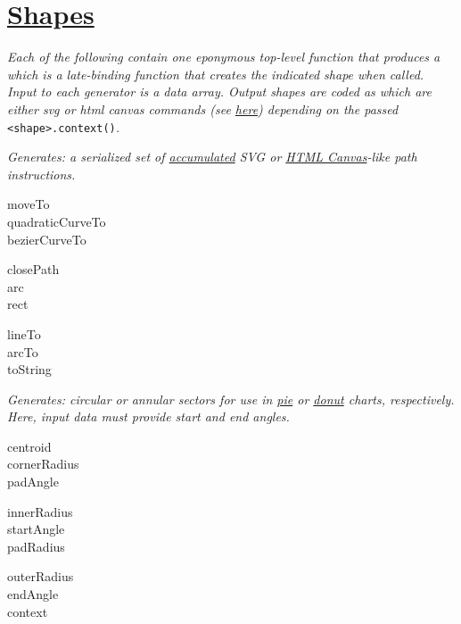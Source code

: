 \section{\href{https://github.com/d3/d3-shape}{Shapes}}

\textit{Each of the following contain one eponymous top-level function that produces a  which is a late-binding function that creates the indicated shape when called. Input to each generator is a data array. Output shapes are coded as  which are either svg or html canvas commands (see \href{https://observablehq.com/@d3/d3-line}{here}) depending on the passed }\texttt{<shape>.context()}\textit{.}



\textit{Generates: a serialized set of \href{https://observablehq.com/@d3/d3-path}{accumulated} SVG or \href{https://developer.mozilla.org/en/docs/Web/API/CanvasRenderingContext2D}{HTML Canvas}-like path instructions.}\\

{\footnotesize
\begin{minipage}[t]{2.6cm}
    moveTo\\
    quadraticCurveTo\\
    bezierCurveTo
\end{minipage}
\begin{minipage}[t]{1.8cm}
    closePath\\
    arc\\
    rect
\end{minipage}
\begin{minipage}[t]{1.6cm}
    lineTo\\
    arcTo\\
    toString
\end{minipage}
}


\textit{Generates: circular or annular sectors for use in \href{https://observablehq.com/@d3/pie-chart}{pie} or \href{https://observablehq.com/@d3/donut-chart}{donut} charts, respectively. Here, input data must provide start and end angles.}
\\

{\footnotesize
\begin{minipage}[t]{2.1cm}
    centroid\\
    cornerRadius\\
    padAngle
\end{minipage}
\begin{minipage}[t]{2.1cm}
    innerRadius\\
    startAngle\\
    padRadius
\end{minipage}
\begin{minipage}[t]{1.8cm}
    outerRadius\\
    endAngle\\
    context
\end{minipage}
}


